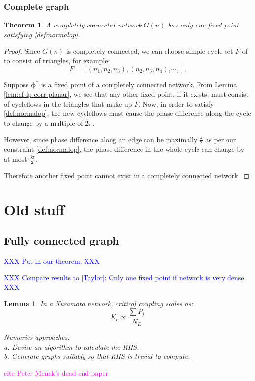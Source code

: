 \documentclass[10pt,aps,pre,preprint,superscriptaddress]{revtex4-1}
\newcommand{\dirk}[1]{\textcolor{blue}{#1}}
\newcommand{\debsankha}[1]{\textcolor{magenta}{#1}}
\renewcommand{\vec}[1]{\boldsymbol{#1}}
\newtheorem{lemma}{Lemma}
\newtheorem{theorem}{Theorem}
\begin{document}
\subsubsection{Complete graph}
\begin{theorem}
\label{}
A completely connected network $G(n)$ has only one fixed point satisfying 
\eqref{def:normalop}. 
\end{theorem}

\begin{proof}
Since $G(n)$ is completely connected, we can choose simple cycle set $F$ of to 
consist of triangles, for example:
\[
F=[(n_1, n_2, n_3), (n_2,n_3,n_4),\cdots, ].
\]

Suppose $\vec{\phi^*}$ is a fixed point of a completely connected network.   
From Lemma \ref{lem:cf-fp-corr-planar}, we see that any other fixed point, if 
it exists, must consist of cycleflows in the triangles that make up $F$.   
Now, in order to satisfy \eqref{def:normalop}, the new cycleflows must cause the 
phase difference along the cycle to change by a multiple of $2\pi$.  

However, since phase difference along an edge can be maximally $\frac{\pi}{2}$ 
as per our constraint \eqref{def:normalop}, the phase difference in the whole 
cycle can change by at most $\frac{3\pi}{2}$.   

Therefore another fixed point cannot exist in a completely connected network.  
\end{proof}


\section{Old stuff}

\subsection{Fully connected graph}

\dirk{XXX Put in our theorem. XXX}

\dirk{XXX Compare results to [Taylor]: Only one fixed point if network is very dense. XXX}

\begin{lemma}
In a Kuramoto network, critical coupling scales as:
\[
K_c\propto \frac{\sum P_j}{N_E}
\]

Numerics approaches: \\
a. Devise an algorithm to calculate the RHS.   \\
b. Generate graphs suitably so that RHS is trivial to compute.  
\end{lemma}
\debsankha{cite Peter Menck's dead end paper}
\end{document}
